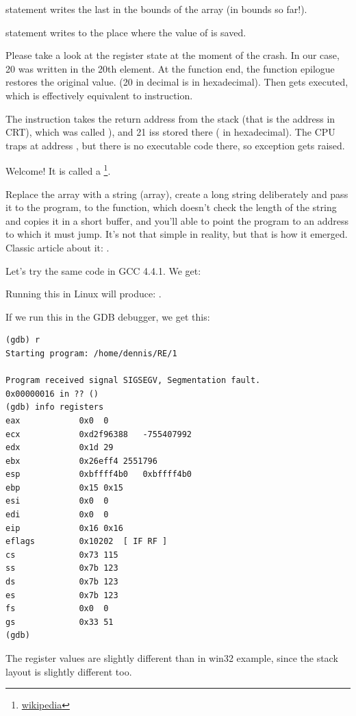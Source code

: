  statement writes the last \Tint in the bounds of the array (in bounds so far!).

 statement writes  to the place where the value of \EBP is saved.

Please take a look at the register state at the moment of the crash. In our case,
20 was written in the 20th element. 
At the function end, the function epilogue restores the original \EBP value.
(20 in decimal is  in hexadecimal).
Then \RET gets executed, which is effectively equivalent to  instruction.

The \RET instruction takes the return address from the stack (that is the address in \ac{CRT}),
which was called \main),
and 21 iss stored there ( in hexadecimal).
The CPU traps at address ,
but there is no executable code there, so exception gets raised.

\myindex{\BufferOverflow}

Welcome! It is called a \footnote{\href{http://go.yurichev.com/17132}{wikipedia}}.

Replace the \Tint array with a string (\Tchar array), create a long string deliberately
and pass it to the program, to the function, which doesn't check the length of the string and copies it in a short buffer,
and you'll able to point the program to an address to which it must jump.
It's not that simple in reality, but that is how it emerged.
Classic article about it: \AlephOne.


Let's try the same code in GCC 4.4.1. We get:



Running this in Linux will produce: .


If we run this in the GDB debugger, we get this:

\begin{lstlisting}
(gdb) r
Starting program: /home/dennis/RE/1 

Program received signal SIGSEGV, Segmentation fault.
0x00000016 in ?? ()
(gdb) info registers
eax            0x0	0
ecx            0xd2f96388	-755407992
edx            0x1d	29
ebx            0x26eff4	2551796
esp            0xbffff4b0	0xbffff4b0
ebp            0x15	0x15
esi            0x0	0
edi            0x0	0
eip            0x16	0x16
eflags         0x10202	[ IF RF ]
cs             0x73	115
ss             0x7b	123
ds             0x7b	123
es             0x7b	123
fs             0x0	0
gs             0x33	51
(gdb) 
\end{lstlisting}

The register values are slightly different than in win32 example, 
since the stack layout is slightly different too.

